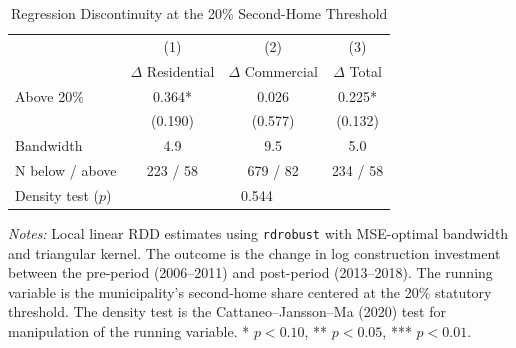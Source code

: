 \begin{table}[H]
\centering
\caption{Regression Discontinuity at the 20\% Second-Home Threshold}
\label{tab:rdd}
\begin{threeparttable}
\begin{tabular}{lccc}
\toprule
 & (1) & (2) & (3) \\
 & $\Delta$ Residential & $\Delta$ Commercial & $\Delta$ Total \\
\midrule
Above 20\% & 0.364* & 0.026 & 0.225* \\
 & (0.190) & (0.577) & (0.132) \\
[0.5em]
Bandwidth & 4.9 & 9.5 & 5.0 \\
N below / above & 223 / 58 & 679 / 82 & 234 / 58 \\
Density test ($p$) & \multicolumn{3}{c}{0.544} \\
\bottomrule
\end{tabular}
\begin{tablenotes}[flushleft]
\small
\item \textit{Notes:} Local linear RDD estimates using \texttt{rdrobust} with MSE-optimal bandwidth and triangular kernel. The outcome is the change in log construction investment between the pre-period (2006--2011) and post-period (2013--2018). The running variable is the municipality's second-home share centered at the 20\% statutory threshold. The density test is the Cattaneo--Jansson--Ma (2020) test for manipulation of the running variable. * $p<0.10$, ** $p<0.05$, *** $p<0.01$.
\end{tablenotes}
\end{threeparttable}
\end{table}

